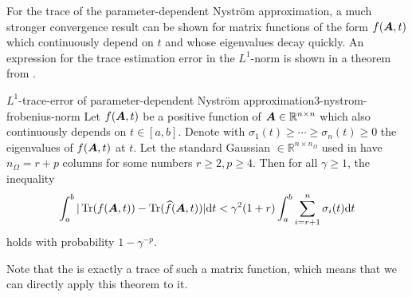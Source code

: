 For the trace of the parameter-dependent Nystr\"om approximation,
a much stronger convergence result can be shown for matrix functions of the form $f(\boldsymbol{A}, t)$
which continuously depend on $t$ and whose eigenvalues decay quickly.
An expression for the trace estimation error in
the $L^1$-norm is shown in a theorem from \cite{he2023parameter}.
\begin{theorem}{$L^1$-trace-error of parameter-dependent Nystr\"om approximation}{3-nystrom-frobenius-norm}
    Let $f(\boldsymbol{A}, t)$ be a positive function of $\boldsymbol{A} \in \mathbb{R}^{n \times n}$ which
    also continuously depends on $t \in [a,b]$. 
    Denote with $\sigma_1(t) \geq \cdots \geq \sigma_n(t) \geq 0$ the eigenvalues of $f(\boldsymbol{A}, t)$ at $t$. Let the
    standard Gaussian  $\in \mathbb{R}^{n \times n_{\Omega}}$
    used in  have
    $n_{\Omega} = r + p$ columns for some numbers $r \geq 2, p \geq 4$. Then
    for all $\gamma \geq 1$, the inequality
    \begin{equation}
        \int_{a}^{b} | \operatorname{Tr}(f(\boldsymbol{A}, t)) - \operatorname{Tr}(\widehat{f}(\boldsymbol{A}, t))| \mathrm{d}t
            < \gamma^2 (1 + r) \int_{a}^{b} \sum_{i = r+1}^n \sigma_i(t) \mathrm{d}t
    \end{equation}
    holds with probability $1 - \gamma^{-p}$.
\end{theorem}
Note that the  
is exactly a trace of such a matrix function, which means that we can directly
apply this theorem to it.

